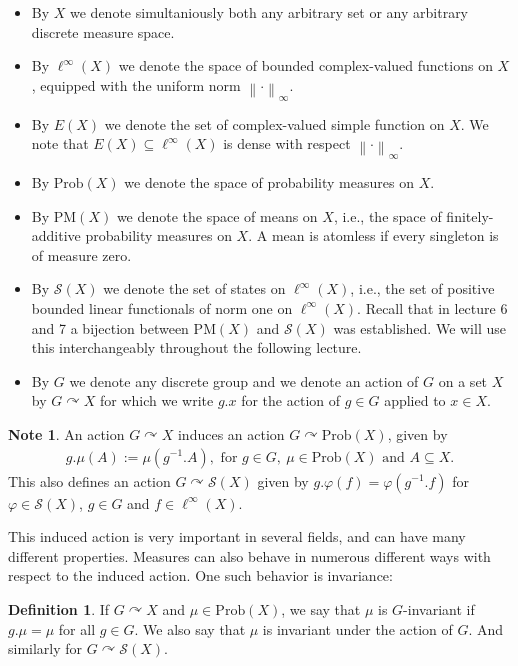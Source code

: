 \documentclass[10pt,oneside,openany,final]{memoir}
\theoremstyle{definition}
\newtheorem{definition}[theorem]{Definition}
\theoremstyle{Break}
\newtheorem*{note}{Note}
\newcommand{\lv}{\left\lVert}
\newcommand{\rv}{\right\rVert}
\renewcommand{\S}{\mathcal{S}}
\newcommand{\Prob}{\mathrm{Prob}}
\newcommand{\PM}{\mathrm{PM}}
\def\acts{\curvearrowright}
\begin{document}
\begin{itemize}
	\item By $X$ we denote simultaniously both any arbitrary set or any arbitrary discrete measure space.
	\item By $\ell^\infty(X)$ we denote the space of bounded complex-valued functions on $X$, equipped with the uniform norm $\lv \cdot \rv_{\infty}$.
	\item By $E(X)$ we denote the set of complex-valued simple function on $X$. We note that $E(X) \subseteq \ell^\infty(X)$ is dense with respect $\lv \cdot \rv_\infty$.
	\item By $\Prob(X)$ we denote the space of probability measures on $X$.
	\item By $\PM(X)$ we denote the space of means on $X$, i.e., the space of finitely-additive probability measures on $X$. A mean is atomless if every singleton is of measure zero.
	\item By $\S(X)$ we denote the set of states on $\ell^\infty(X)$, i.e., the set of positive bounded linear functionals of norm one on $\ell^\infty(X)$. Recall that in lecture 6 and 7 a bijection between $\PM(X)$ and $\S(X)$ was established. We will use this interchangeably throughout the following lecture.
	\item By $G$ we denote any discrete group and we denote an action of $G$ on a set $X$ by $G\acts X$ for which we write $g.x$ for the action of $g\in G$ applied to $x \in X$.	
\end{itemize}
\begin{note}
	An action $G \acts X$ induces an action $G \acts \Prob(X)$, given by 
	\begin{align*}
		g.\mu(A):=\mu(g^{-1}.A), \text{ for } g \in G, \ \mu \in \Prob(X) \text{ and } A \subseteq X.
	\end{align*}
This also defines an action $G \acts \S(X)$ given by $g.\varphi(f)=\varphi(g^{-1}.f)$ for $\varphi \in \S(X)$, $g \in G$ and $f \in \ell^\infty(X)$.
\end{note}
This induced action is very important in several fields, and can have many different properties. Measures can also behave in numerous different ways with respect to the induced action. One such behavior is invariance:
\begin{definition}
	If $G \acts X$ and $\mu \in \Prob(X)$, we say that $\mu$ is $G$-invariant if $g.\mu=\mu$ for all $g \in G$. We also say that $\mu$ is invariant under the action of $G$. And similarly for $G \acts \S(X)$.
\end{definition}
\end{document}

